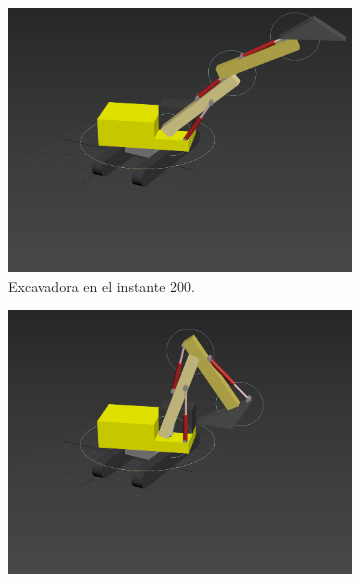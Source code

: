 \begin{figure}[H]\ContinuedFloat
\begin{subfigure}[t]{0.48\textwidth}
    \centering
    \includegraphics[width=\textwidth]{imagenes/animacion/200.png}
    \caption{Excavadora en el instante 200.}
\end{subfigure}
\hfill
\begin{subfigure}[t]{0.48\textwidth}
    \centering
    \includegraphics[width=\textwidth]{imagenes/animacion/240.png}

\end{subfigure}
\end{figure}
